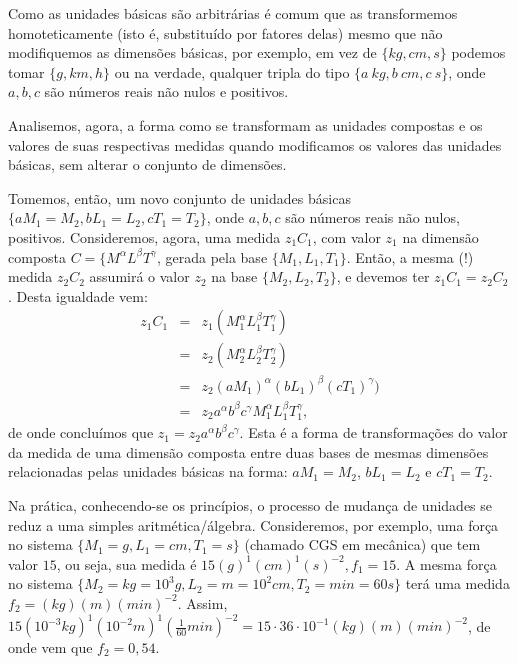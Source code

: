     Como as unidades básicas são arbitrárias é comum que as transformemos homoteticamente (isto é, substituído por fatores delas) mesmo que não modifiquemos as dimensões básicas, por exemplo, em vez de \(\{kg, cm, s\}\) podemos tomar \(\{g, km, h\}\) ou na verdade, qualquer tripla do tipo \(\{a~kg, b~cm, c~s\}\), onde \(a, b, c\) são números reais não nulos e positivos.

    Analisemos, agora, a forma como se transformam as unidades compostas e os valores de suas respectivas medidas quando modificamos os valores das unidades básicas, sem alterar o conjunto de dimensões.

    Tomemos, então, um novo conjunto de unidades básicas \(\{aM_1 = M_2, bL_1 = L_2, cT_1 = T_2\}\), onde \(a, b, c\) são números reais não nulos, positivos. Consideremos, agora, uma medida \(z_{1}C_{1}\), com valor \(z_{1}\) na dimensão composta \(C = \{M^{\alpha} L^{\beta} T^{\gamma}\), gerada pela base \(\{M_1, L_1, T_1\}\). Então, a mesma (!) medida \(z_{2}C_{2}\) assumirá o valor \(z_{2}\) na base \(\{M_{2},L_{2},T_{2}\}\), e devemos ter \(z_{1}C_{1} = z_{2}C_{2}\). Desta igualdade vem:
    \[\begin{array}{rcl}
    z_{1}C_{1}
    &=& z_{1} (M_{1}^{\alpha} L_{1}^{\beta} T_{1}^{\gamma}) \\[0.2cm]
    &=& z_{2} (M_{2}^{\alpha} L_{2}^{\beta} T_{2}^{\gamma}) \\[0.2cm]
    &=& z_{2} (aM_{1})^{\alpha} (bL_{1})^{\beta} (cT_{1})^{\gamma}) \\[0.2cm]
    &=& z_{2} a^{\alpha} b^{\beta} c^{\gamma} M_{1}^{\alpha} L_{1}^{\beta} T_{1}^{\gamma},
    \end{array}\]
    de onde concluímos que \(z_{1} = z_{2} a^{\alpha} b^{\beta} c^{\gamma}\). Esta é a forma de transformações do valor da medida de uma dimensão composta entre duas bases de mesmas dimensões relacionadas pelas unidades básicas na forma: \(aM_{1} = M_{2}\), \(b L_{1} = L_{2}\) e \(cT_{1} = T_{2}\).

    Na prática, conhecendo-se os princípios, o processo de mudança de unidades se reduz a uma simples aritmética/álgebra. Consideremos, por exemplo, uma força no sistema \(\{M_{1} = g, L_{1} = cm, T_{1} = s\}\) (chamado CGS em mecânica) que tem valor \(15\), ou seja, sua medida é \(15(g)^{1} (cm)^{1} (s)^{-2}, f_1 = 15\). A mesma força no sistema \(\{M_{2} = kg = 10^{3} g, L_{2} = m = 10^{2} cm, T_{2} = min = 60 s\}\) terá uma medida \(f_2 = (kg) (m) (min)^{-2}\). Assim, \(15 (10^{-3}kg)^{1} (10^{-2}m)^{1} (\frac{1}{60} min)^{-2} = 15 \cdot 36 \cdot 10^{-1} (kg)(m)(min)^{-2}\), de onde vem que \(f_2 = 0,54\).

